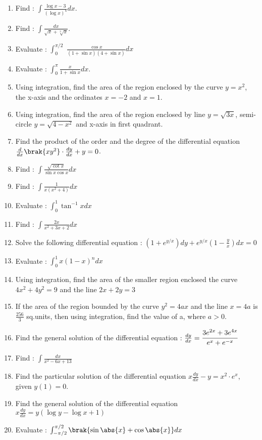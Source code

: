 \begin{enumerate}
      \item Find : $\int \frac{\log x-3}{(\log x)^4}dx.$
      \item Find : $\int \frac{dx}{\sqrt{x}+\sqrt[3]{x}}.$
      \item Evaluate : $\int_{0}^{\pi/2}$ $ \frac{\cos x}{(1 + \sin x)(4 + \sin x)}dx$
      \item Evaluate : $\int_{0}^{\pi} \frac{x}{1 + \sin x}dx.$
      \item Using integration, find the area of the region enclosed by the curve $y = x^2$, the x-axis and the ordinates $x=-2$ and $x=1$.
      \item Using integration, find the area of the region enclosed by line $y = \sqrt{3x}$, semi-circle $y = \sqrt{4-x^2}$ and x-axis in first quadrant.
      \item Find the product of the order and the degree of the differential equation  
      $\frac{d}{dx}\brak{xy^2}\cdot \frac{dy}{dx}+y = 0$. 
      \item Find : $\int \frac{\sqrt{\cot x}}{\sin x \cos x} dx$
      \item Find : $\int \frac{1}{x(x^2 + 4)}dx$
      \item Evaluate : $\int_{0}^{1} \tan^{-1} xdx$
      \item Find : $\int \frac{2x}{x^2 + 3x + 2 } dx$
      \item Solve the following differential equation :
      $\left(1 + e^{y/x}\right)dy + e^{y/x} (1-\frac{y}{x})dx = 0$
      \item Evaluate : $\int_{0}^1 x(1-x)^n dx$
      \item Using integration, find the area of the smaller region enclosed the curve  $4x^2 + 4y^2 = 9$ and the line $2x + 2y = 3$
      \item If the area of the region bounded by the curve $y^2 = 4ax$ and the line $x = 4a$ is $\frac{256}{3}$ sq.units, then using integration, find the value of a, where $a > 0$.
      \item Find the general solution of the differential equation : $\frac{dy}{dx}=\cfrac{3e^{2x}+3e^{4x}}{e^x + e^{-x}}$
      \item Find : $\int \frac{dx}{x^2 - 6x + 13}$
      \item Find the particular solution of the differential equation  $x \frac{dy}{dx}-y = x^2 \cdot e^x$, given  $y(1) = 0$.
      \item Find the general solution of the differential equation $x\frac{dy}{dx}=y(\log y- \log x+1)$
      \item Evaluate : $\int_{-\pi/2}^{\pi/2} \brak{\sin \abs{x} + \cos \abs{x} }dx$

\end{enumerate}
